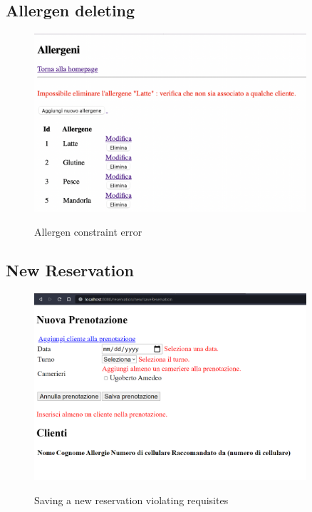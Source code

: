 \documentclass{article}
\begin{document}
    \vspace*{5mm}

    \subsection*{Allergen deleting}
    \begin{figure}[H]
        \centering
        \includegraphics[width=0.9\textwidth]{images/allergen_constraint_error.png}
        \label{fig:allergen_constraint_error}
        \caption{Allergen constraint error}
    \end{figure}

    \vspace*{5mm}

    \subsection*{New Reservation}
    \label{sec:new_reservation_form_errors}
    \begin{figure}[H]
        \centering
        \includegraphics[width=0.9\textwidth]{images/new_reservation_form_errors}
        \label{fig:new_reservation_form_errors}
        \caption{Saving a new reservation violating requisites}
    \end{figure}
\end{document}
